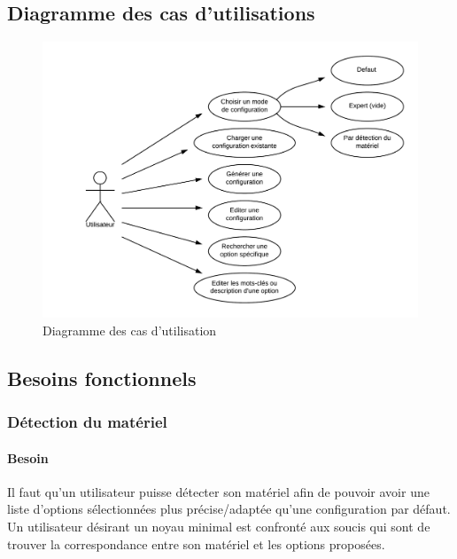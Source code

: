 \documentclass[16pts]{report}
\begin{document}
        \subsection{Diagramme des cas d'utilisations}
        \label{sub:Diagramme des cas d'utilisations}

\begin{figure}[H]
    \includegraphics[scale=0.25]{illustrations/diagramme_cas_utilisation.png}
    \centering
    \caption{Diagramme des cas d'utilisation}
    \label{fig:DCU}
\end{figure}

        \subsection{Besoins fonctionnels}
        \label{sub:Besoins fonctionnels}

\subsubsection{Détection du matériel}
\label{ssub:Détection du matériel}
\paragraph{Besoin}
\label{sssbus:Besoin}

Il faut qu’un utilisateur puisse détecter son matériel afin de pouvoir
avoir une liste d’options sélectionnées plus précise/adaptée qu’une
configuration par défaut. Un utilisateur désirant un noyau minimal est
confronté aux soucis qui sont de trouver la correspondance entre son matériel et
les options proposées.
\end{document}
